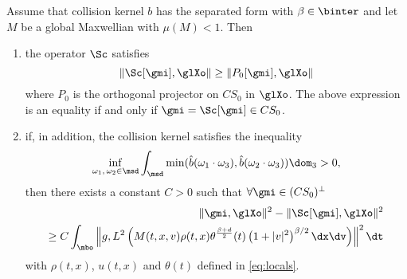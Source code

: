 \begin{theorem}
	\label{th:sc:2}
	Assume that collision kernel $b$ has the separated form with $\beta\in \binter$ and let $M$ be a global Maxwellian with $\mu(M)<1$. Then
	\begin{enumerate}
		\item the operator $\Sc$ satisfies \[\|\Sc[\gmi],\glXo\|\ge \|P_0[\gmi],\glXo\|\]
		where $P_0$ is the orthogonal projector on $CS_0$ in $\glXo$. The  above expression is an equality  if and only if $\gmi=\Sc[\gmi]\in CS_0$.
		\item if, in addition, the collision kernel satisfies the inequality
		\[\inf_{\omega_1,\, \omega_2\in\msd}\int_{\msd} \min(\hat b(\omega_1\cdot \omega_3),\hat  b(\omega_2\cdot \omega_3))\dom_3>0,\]
		then there exists a constant $C>0$ such that $\forall \gmi  \in (CS_0)^\bot$ 
		\begin{equation}\label{eq:key}
			\begin{split}
					 \| \gmi ,\glXo\|^2-\|\Sc[\gmi],\glXo\|^2 
					 \\ \ge C \int_{\mbo}\left\|g,L^2\left(M(t,x,v)\rho(t,x)\theta^{\frac{\beta+d}{2}}	(t)\left(1+ |v |^2\right)^{\beta/2}\dx\dv \right)\right\|^2\dt
				\end{split}
		\end{equation}
		with $\rho(t,x)$, $u(t,x)$ and $\theta(t)$ defined in \eqref{eq:locals}.
 	\end{enumerate}
\end{theorem}
